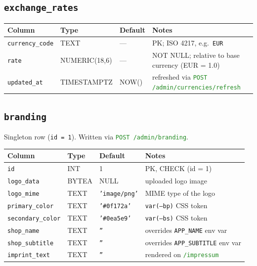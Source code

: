 \documentclass[12pt,a4paper,twoside]{report}
\newcommand{\code}[1]{\texttt{#1}}
\newcommand{\route}[1]{\texttt{\textcolor{ForestGreen}{#1}}}
\begin{document}
\subsection*{\texttt{exchange\_rates}}

\begin{table}[H]
  \centering\small
  \begin{tabular}{@{}llll@{}}
    \toprule
    \textbf{Column} & \textbf{Type} & \textbf{Default} & \textbf{Notes} \\
    \midrule
    \code{currency\_code} & TEXT          & --- & PK; ISO 4217, e.g.\ \code{EUR} \\
    \code{rate}           & NUMERIC(18,6) & --- & NOT NULL; relative to base currency (EUR = 1.0) \\
    \code{updated\_at}    & TIMESTAMPTZ   & NOW() & refreshed via \route{POST /admin/currencies/refresh} \\
    \bottomrule
  \end{tabular}
\end{table}

\subsection*{\texttt{branding}}

Singleton row (\code{id = 1}).  Written via \route{POST /admin/branding}.

\begin{table}[H]
  \centering\small
  \begin{tabular}{@{}llll@{}}
    \toprule
    \textbf{Column} & \textbf{Type} & \textbf{Default} & \textbf{Notes} \\
    \midrule
    \code{id}             & INT   & 1                    & PK, CHECK (id = 1) \\
    \code{logo\_data}     & BYTEA & NULL                 & uploaded logo image \\
    \code{logo\_mime}     & TEXT  & \code{'image/png'}   & MIME type of the logo \\
    \code{primary\_color} & TEXT  & \code{'\#0f172a'}    & \code{var(--bp)} CSS token \\
    \code{secondary\_color}& TEXT & \code{'\#0ea5e9'}    & \code{var(--bs)} CSS token \\
    \code{shop\_name}     & TEXT  & \code{''}            & overrides \code{APP\_NAME} env var \\
    \code{shop\_subtitle} & TEXT  & \code{''}            & overrides \code{APP\_SUBTITLE} env var \\
    \code{imprint\_text}  & TEXT  & \code{''}            & rendered on \route{/impressum} \\
    \bottomrule
  \end{tabular}
\end{table}
\end{document}
